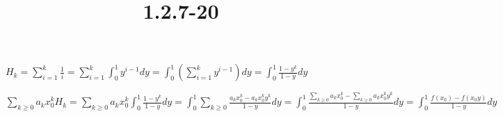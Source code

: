 \documentclass{article}
\title{1.2.7-20}
\begin{document}
\maketitle

$H_k = \sum_{i=1}^k \frac{1}{i} = \sum_{i=1}^{k} \int_0^1 y^{i-1}dy = \int_0^1 (\sum_{i=1}^k y^{i-1}) dy = \int_0^1 \frac{1-y^k}{1-y} dy$

$\sum_{k \geq 0} a_kx_0^k H_k = \sum_{k \geq 0} a_kx_0^k \int_0^1 \frac{1-y^k}{1-y} dy = \int_0^1 \sum_{k \geq 0} \frac{a_kx_0^k - a_kx_0^ky^k}{1-y} dy = \int_0^1 \frac{\sum_{k \geq 0}a_kx_0^k - \sum_{k \geq 0}a_kx_0^ky^k}{1-y} dy = \int_0^1 \frac{f(x_0) - f(x_0y)}{1-y} dy$
\end{document}
